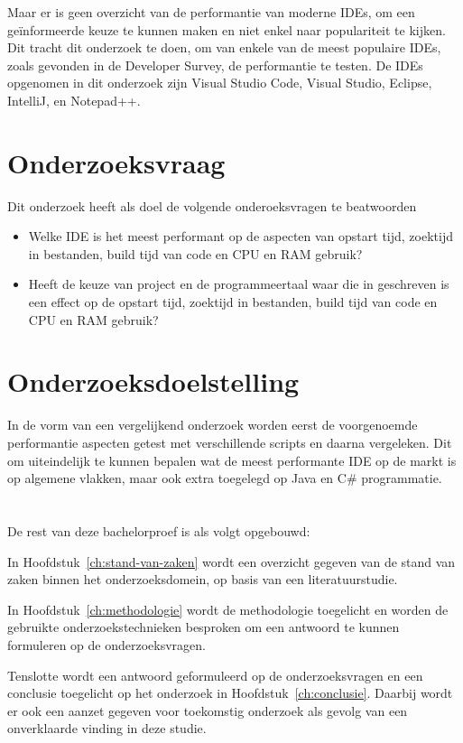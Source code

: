 Maar er is geen overzicht van de performantie van moderne IDEs, om een geïnformeerde keuze te kunnen maken en niet enkel naar populariteit te kijken. Dit tracht dit onderzoek te doen, om van enkele van de meest populaire IDEs, zoals gevonden in de \autocite{StackOverflow2021} Developer Survey, de performantie te testen. De IDEs opgenomen in dit onderzoek zijn Visual Studio Code, Visual Studio, Eclipse, IntelliJ, en Notepad++.

\newpage

\section{Onderzoeksvraag}

Dit onderzoek heeft als doel de volgende onderoeksvragen te beatwoorden

\begin{itemize}
    \item Welke IDE is het meest performant op de aspecten van opstart tijd, zoektijd in bestanden, build tijd van code en CPU en RAM gebruik?
    \item Heeft de keuze van project en de programmeertaal waar die in geschreven is een effect op de opstart tijd, zoektijd in bestanden, build tijd van code en CPU en RAM gebruik?
\end{itemize}

\section{Onderzoeksdoelstelling}

In de vorm van een vergelijkend onderzoek worden eerst de voorgenoemde performantie aspecten getest met verschillende scripts en daarna vergeleken. Dit om uiteindelijk te kunnen bepalen wat de meest performante IDE op de markt is op algemene vlakken, maar ook extra toegelegd op Java en C\# programmatie.

\section{}
\label{sec:opzet-bachelorproef}


De rest van deze bachelorproef is als volgt opgebouwd:

In Hoofdstuk~\ref{ch:stand-van-zaken} wordt een overzicht gegeven van de stand van zaken binnen het onderzoeksdomein, op basis van een literatuurstudie.

In Hoofdstuk~\ref{ch:methodologie} wordt de methodologie toegelicht en worden de gebruikte onderzoekstechnieken besproken om een antwoord te kunnen formuleren op de onderzoeksvragen.

Tenslotte wordt een antwoord geformuleerd op de onderzoeksvragen en een conclusie
toegelicht op het onderzoek in Hoofdstuk~\ref{ch:conclusie}. Daarbij wordt er ook een aanzet gegeven voor toekomstig onderzoek als gevolg van een onverklaarde vinding in deze studie.

